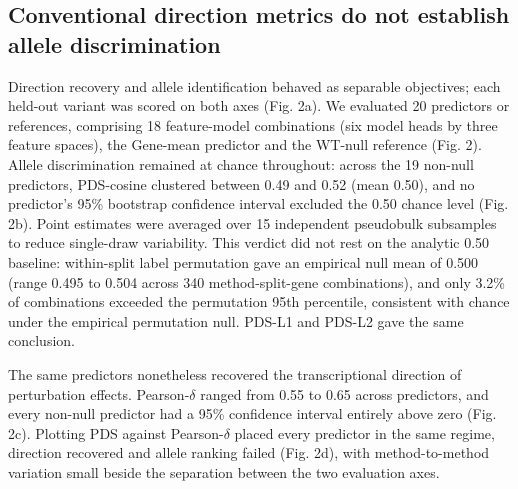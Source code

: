 \documentclass[11pt,letterpaper]{article}
\begin{document}
\subsection*{Conventional direction metrics do not establish allele discrimination}

Direction recovery and allele identification behaved as separable objectives; each held-out variant was scored on both axes (Fig. 2a). We evaluated 20 predictors or references, comprising 18 feature-model combinations (six model heads by three feature spaces), the Gene-mean predictor and the WT-null reference (Fig. 2). Allele discrimination remained at chance throughout: across the 19 non-null predictors, PDS-cosine clustered between 0.49 and 0.52 (mean 0.50), and no predictor's 95\% bootstrap confidence interval excluded the 0.50 chance level (Fig. 2b). Point estimates were averaged over 15 independent pseudobulk subsamples to reduce single-draw variability. This verdict did not rest on the analytic 0.50 baseline: within-split label permutation gave an empirical null mean of 0.500 (range 0.495 to 0.504 across 340 method-split-gene combinations), and only 3.2\% of combinations exceeded the permutation 95th percentile, consistent with chance under the empirical permutation null. PDS-L1 and PDS-L2 gave the same conclusion.

The same predictors nonetheless recovered the transcriptional direction of perturbation effects. Pearson-$\delta$ ranged from 0.55 to 0.65 across predictors, and every non-null predictor had a 95\% confidence interval entirely above zero (Fig. 2c). Plotting PDS against Pearson-$\delta$ placed every predictor in the same regime, direction recovered and allele ranking failed (Fig. 2d), with method-to-method variation small beside the separation between the two evaluation axes.
\end{document}
